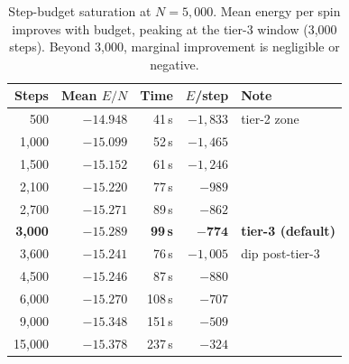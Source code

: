 \documentclass[11pt,a4paper]{article}
\begin{document}
\begin{table}[H]
\centering
\caption{Step-budget saturation at $N = 5{,}000$. Mean energy per spin improves with budget, peaking at the tier-3 window (3{,}000 steps). Beyond 3{,}000, marginal improvement is negligible or negative.}
\label{tab:stag_sweep}
\begin{tabular}{rrrrl}
\toprule
\textbf{Steps} & \textbf{Mean $E/N$} & \textbf{Time} & \textbf{$E$/step} & \textbf{Note}\\
\midrule
500 & $-14.948$ & 41\,s & $-1{,}833$ & tier-2 zone\\
1{,}000 & $-15.099$ & 52\,s & $-1{,}465$ & \\
1{,}500 & $-15.152$ & 61\,s & $-1{,}246$ & \\
2{,}100 & $-15.220$ & 77\,s & $-989$ & \\
2{,}700 & $-15.271$ & 89\,s & $-862$ & \\
\textbf{3{,}000} & $\mathbf{-15.289}$ & \textbf{99\,s} & $\mathbf{-774}$ & \textbf{tier-3 (default)}\\
3{,}600 & $-15.241$ & 76\,s & $-1{,}005$ & dip post-tier-3\\
4{,}500 & $-15.246$ & 87\,s & $-880$ & \\
6{,}000 & $-15.270$ & 108\,s & $-707$ & \\
9{,}000 & $-15.348$ & 151\,s & $-509$ & \\
15{,}000 & $-15.378$ & 237\,s & $-324$ & \\
\bottomrule
\end{tabular}
\end{table}
\end{document}
